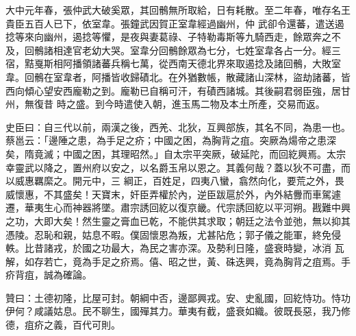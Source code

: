 \begin{pinyinscope}
 大中元年春，張仲武大破奚眾，其回鶻無所取給，日有耗散。至二年春，唯存名王貴臣五百人已下，依室韋。張鐘武因賀正室韋經過幽州，仲
 武卻令還蕃，遣送遏捻等來向幽州，遏捻等懼，是夜與妻葛祿、子特勒毒斯等九騎西走，餘眾奔之不及，回鶻諸相達官老幼大哭。室韋分回鶻餘眾為七分，七姓室韋各占一分。經三宿，黠戛斯相阿播領諸蕃兵稱七萬，從西南天德北界來取遏捻及諸回鶻，大敗室韋。回鶻在室韋者，阿播皆收歸磧北。在外猶數帳，散藏諸山深林，盜劫諸蕃，皆西向傾心望安西龐勒之到。龐勒已自稱可汗，有磧西諸城。其後嗣君弱臣強，居甘州，無復昔
 時之盛。到今時遣使入朝，進玉馬二物及本土所產，交易而返。



 史臣曰：自三代以前，兩漢之後，西羌、北狄，互興部族，其名不同，為患一也。蔡邕云：「邊陲之患，為手足之疥；中國之困，為胸背之疽。突厥為煬帝之患深矣，隋竟滅；中國之困，其理昭然。」自太宗平突厥，破延陀，而回紇興焉。太宗幸靈武以降之，置州府以安之，以名爵玉帛以恩之。其義何哉？蓋以狄不可盡，而以威惠羈縻之。開元中，三
 綱正，百姓足，四夷八蠻，翕然向化，要荒之外，畏威懷惠，不其盛矣！天寶末，奸臣弄權於內，逆臣跋扈於外，內外結釁而車駕遽遷，華夷生心而神器將墜。肅宗誘回紇以復京畿。代宗誘回紇以平河朔。戡難中興之功，大即大矣！然生靈之膏血已乾，不能供其求取；朝廷之法令並弛，無以抑其憑陵。忍恥和親，姑息不暇。僕固懷恩為叛，尤甚阽危；郭子儀之能軍，終免侵軼。比昔諸戎，於國之功最大，為民之害亦深。及勢利日隆，盛衰時變，冰消
 瓦解，如存若亡，竟為手足之疥焉。僖、昭之世，黃、硃迭興，竟為胸背之疽焉。手疥背疽，誠為確論。



 贊曰：土德初隆，比屋可封。朝綱中否，邊鄙興戎。安、史亂國，回紇恃功。恃功伊何？咸議姑息。民不聊生，國殫其力。華夷有截，盛衰如織。彼既長惡，我乃修德，疽疥之義，百代可則。



\end{pinyinscope}